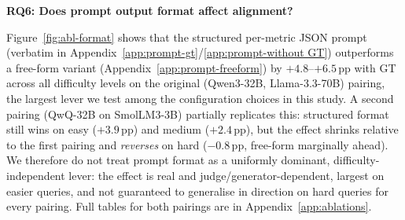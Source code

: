\textbf{RQ6: Does prompt output format affect alignment?}
\label{sec:abl:format}

Figure~\ref{fig:abl-format} shows that the structured per-metric JSON prompt (verbatim in Appendix~\ref{app:prompt-gt}/\ref{app:prompt-without GT}) outperforms a free-form variant (Appendix~\ref{app:prompt-freeform}) by $+4.8$--$+6.5$\,pp with GT across all difficulty levels on the original (Qwen3-32B, Llama-3.3-70B) pairing, the largest lever we test among the configuration choices in this study. A second pairing (QwQ-32B on SmolLM3-3B) partially replicates this: structured format still wins on easy ($+3.9$\,pp) and medium ($+2.4$\,pp), but the effect shrinks relative to the first pairing and \emph{reverses} on hard ($-0.8$\,pp, free-form marginally ahead). We therefore do not treat prompt format as a uniformly dominant, difficulty-independent lever: the effect is real and judge/generator-dependent, largest on easier queries, and not guaranteed to generalise in direction on hard queries for every pairing. Full tables for both pairings are in Appendix~\ref{app:ablations}.